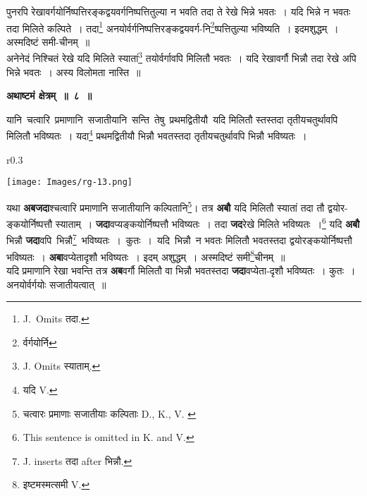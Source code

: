 \documentclass[11pt, openany]{book}
\begin{document}
पुनरपि रेखावर्गयोर्निष्पत्तिरङ्कद्वयवर्गनिष्पत्तितुल्या न भवति तदा ते रेखे भिन्ने भवतः~। यदि भिन्ने न भवतः तदा मिलिते कल्पिते~। तदा\renewcommand{\thefootnote}{४}\footnote{{\en J.~Omits} तदा.} अनयोर्वर्गनिष्पत्तिरङ्कद्वयवर्ग-नि\renewcommand{\thefootnote}{५}\footnote{र्वर्गयोर्नि}ष्पत्तितुल्या भविष्यति~। इदमशुद्धम्~। अस्मदिष्टं समी-चीनम्~॥ \\

 अनेनेदं निश्चितं रेखे यदि मिलिते स्यातां\renewcommand{\thefootnote}{६}\footnote{{\en J. Omits} स्याताम्.} तयोर्वर्गावपि मिलितौ भवतः~। यदि रेखावर्गौ भिन्नौ तदा रेखे अपि भिन्ने भवतः~। अस्य विलोमता नास्ति~॥ 

\newpage
\begin{center}
\textbf{\large अथाष्टमं क्षेत्रम्~॥~८~॥}
\end{center}

{\ab  यानि \,चत्वारि \,प्रमाणानि \,सजातीयानि \,सन्ति \,तेषु \,प्रथमद्वितीयौ \,यदि मिलितौ स्तस्तदा तृतीयचतुर्थावपि मिलितौ भविष्यतः~। यदा\renewcommand{\thefootnote}{१}\footnote{यदि {\en V.}} प्रथमद्वितीयौ भिन्नौ भवतस्तदा तृतीयचतुर्थावपि भिन्नौ भविष्यतः~।} \\

\begin{wrapfigure}{r}{0.3\textwidth}
\vspace{-8mm}
\begin{center}
\texttt{[image: Images/rg-13.png]}
\end{center}
\vspace{-8mm}
\end{wrapfigure}

 यथा \textbf{अबजदा}श्चत्वारि प्रमाणानि सजातीयानि कल्पितानि\renewcommand{\thefootnote}{२}\footnote{चत्वारः प्रमाणाः सजातीयाः कल्पिताः {\en D., K., V. }}\;। तत्र \textbf{अबौ} यदि मिलितौ स्यातां तदा तौ द्वयोर-ङ्कयोर्निष्पत्तौ स्याताम्~। \textbf{जदा}वप्यङ्कयोर्निष्पत्तौ भविष्यतः~। तदा \textbf{जद}रेखे मिलिते भविष्यतः~।\renewcommand{\thefootnote}{३}\footnote{\en This sentence is omitted in K. and V.} यदि \textbf{अबौ}  भिन्नौ \textbf{जदा}वपि  \,भिन्नौ\renewcommand{\thefootnote}{४}\footnote{{\en J. inserts} तदा {\en after} भिन्नौ.} \,भविष्यतः~। \,कुतः~। \,यदि \,भिन्नौ \,न भवतः मिलितौ भवतस्तदा द्वयोरङ्कयोर्निष्पत्तौ भविष्यतः~। \textbf{अबा}वप्येतादृशौ भविष्यतः~। इदम् अशुद्धम्~। अस्मदिष्टं समी\renewcommand{\thefootnote}{५}\footnote{इष्टमस्मत्समी {\en V.}}चीनम्~॥ \\

 यदि प्रमाणानि रेखा भवन्ति तत्र \textbf{अब}वर्गौ मिलितौ वा भिन्नौ भवतस्तदा \textbf{जदा}वप्येता-दृशौ भविष्यतः~। कुतः~। अनयोर्वर्गयोः सजातीयत्वात्~॥ 
\vspace{2mm}
\end{document}
